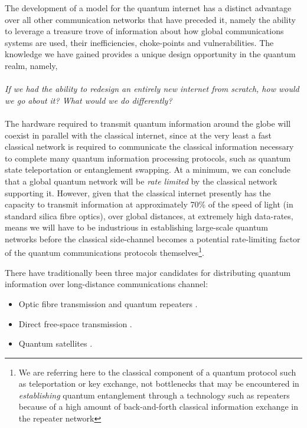 \documentclass[twocolumn, aps, rmp, amsmath, amssymb, nofootinbib, superscriptaddress, longbibliography, floatfix, table-of-contents, eqsecnum]{revtex4-2}
\begin{document}
The development of a model for the quantum internet \cite{SD-Wehner:2018aa} has a distinct advantage over all other communication networks that have preceded it, namely the ability to leverage a treasure trove of information about how global communications systems are used, their inefficiencies, choke-points and vulnerabilities. The knowledge we have gained provides a unique design opportunity in the quantum realm, namely, 
\\
\\
\textit{If we had the ability to redesign an entirely new internet from scratch, how would we go about it? What would we do differently?}
\\
\\
The hardware required to transmit quantum information around the globe will coexist in parallel with the classical internet, since at the very least a fast classical network is required to communicate the classical information necessary to complete many quantum information processing protocols, such as quantum state teleportation or entanglement swapping. At a minimum, we can conclude that a global quantum network will be \textit{rate limited} by the classical network supporting it. However, given that the classical internet presently has the capacity to transmit information at approximately 70\% of the speed of light (in standard silica fibre optics), over global distances, at extremely high data-rates, means we will have to be industrious in establishing large-scale quantum networks before the classical side-channel becomes a potential rate-limiting factor of the quantum communications protocols themselves\footnote{We are referring here to the classical component of a quantum protocol such as teleportation or key exchange, not bottlenecks that may be encountered in {\em establishing} quantum entanglement through a technology such as repeaters because of a high amount of back-and-forth classical information exchange in the repeater network}.

There have traditionally been three major candidates for distributing quantum information over long-distance communications channel:
\begin{itemize}
\item Optic fibre transmission and quantum repeaters \cite{SD-Fowler:2010aa,SD-Sangouard:2011aa,SD-Munro:2012aa,SD-Azuma:2015aa}.
\item Direct free-space transmission \cite{SD-Ursin:2007aa,SD-Ma:2012aa}.
\item Quantum satellites \cite{SD-Tang:2016aa,SD-Takenaka:2017aa,SD-Yin:2017aa}. 
\end{itemize}
\end{document}
